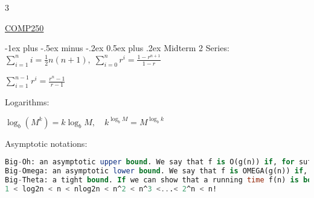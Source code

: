 \documentclass[10pt,landscape]{article}
\makeatletter
\renewcommand{\section}{\@startsection{section}{1}{0mm}%
                                {-1ex plus -.5ex minus -.2ex}%
                                {0.5ex plus .2ex}%
                                {\normalfont\large\bfseries}}
\makeatother
\begin{document}
\raggedright
\footnotesize
\begin{multicols}{3}


\setlength{\premulticols}{1pt}
\setlength{\postmulticols}{1pt}
\setlength{\multicolsep}{1pt}
\setlength{\columnsep}{2pt}

\begin{center}
     \Large{\underline{COMP250}} \\
\end{center}

\section{Midterm 2}
Series: 
$\sum^n_{i= 1} i = \frac{1}{2} n(n+1), \; \sum^n_{i =0 }r^i = \frac{1-r^{n+1}}{1-r}$

$\sum^{n-1}_{i= 1} r^i = \frac{r^n -1}{r-1}$

Logarithms:

$\log_b(M^k) = k\log_b M,\quad k^{\log_b M} = M^{\log_b k}$

Asymptotic notations:
\begin{lstlisting}[language=SQL]
Big-Oh: an asymptotic upper bound. We say that f is O(g(n)) if, for sufficiently large n, the function f(n) is bounded above by a constant multiple of g(n). 
Big-Omega: an asymptotic lower bound. We say that f is OMEGA(g(n)) if, for sufficiently large n, the function f(n) is bounded below by a constant multiple of g(n).
Big-Theta: a tight bound. If we can show that a running time f(n) is both O(g(n)) and OMEGA(g(n)), then g(n) is a tight bound for f(n). That is, f(n) grows like g(n) to within a constant factor.
1 < log2n < n < nlog2n < n^2 < n^3 <...< 2^n < n!
\end{lstlisting}


\end{multicols}
\end{document}

